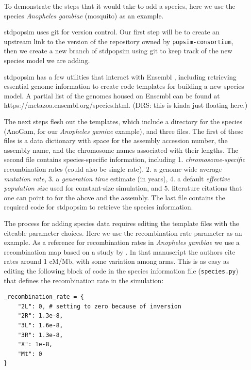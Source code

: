 \documentclass[hidelinks]{article}
\begin{document}
To demonstrate the steps that it would take to add a species, here we
use the species \emph{Anopheles gambiae} (mosquito) as an example.

stdpopsim uses git for version control. Our first step will be to create an upstream
link to the version of the repository owned by
\texttt{popsim-consortium}, then we create a new branch of stdpopsim
using git to keep track of the new species model we are adding.

stdpopsim has a few utilities that interact with Ensembl \citep{ensembl2021},
including retrieving essential genome information to create code
templates for building a new species model. A partial list of the
genomes housed on Ensembl can be found at
https://metazoa.ensembl.org/species.html. (DRS: this is kinda just floating here.)

The next steps flesh out the templates, which include a directory for
the species (AnoGam, for our \emph{Anopheles gamiae} example), and three
files. The first of these files is a data dictionary with space for the assembly
accession number, the assembly name, and the
chromosome names associated with their lengths. The second file contains
species-specific information, including 1. \emph{chromosome-specific}
recombination rates (could also be single rate), 2. a genome-wide
average \emph{mutation rate}, 3. a \emph{generation time} estimate (in
years), 4. a default \emph{effective population size}
used for constant-size simulation, and 5. literature
citations that one can point to for the above and the assembly. The last
file contains the required code for stdpopsim to retrieve the species
information.

The process for adding species data requires editing the template files
with the citeable parameter choices. Here we use the recombination rate
parameter as an example. As a reference for recombination rates in
\emph{Anopheles gambiae} we use a recombination map based on a study
by \citep{Pombi2006}. In that manuscript
the authors cite rates around 1 cM/Mb, with some variation among
arms. This is as easy as editing the following block of code in the
species information file (\texttt{species.py}) that defines the
recombination rate in the simulation:

\begin{verbatim}
_recombination_rate = {
    "2L": 0, # setting to zero because of inversion
    "2R": 1.3e-8,
    "3L": 1.6e-8,
    "3R": 1.3e-8,
    "X": 1e-8,
    "Mt": 0
}
\end{verbatim}
\end{document}
